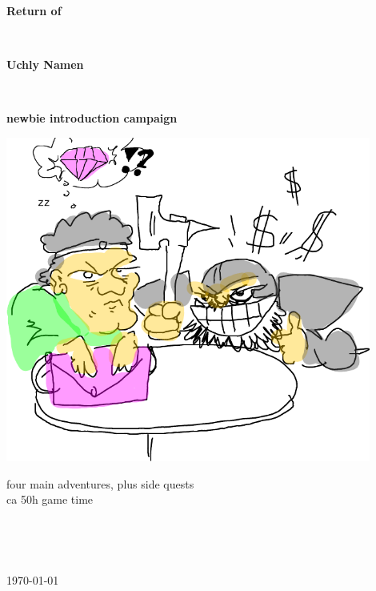 \begin{titlepage}

\begin{center}

   \vspace{4 cm}

   \textbf{\Huge{Return of}}

   \

   \textbf{\Huge{Uchly Namen}}

   \

   \textbf{\Large{newbie introduction campaign}}

   \vspace{2 cm}
   \includegraphics[width=120mm]{./figs/playthrough/negotiate.png}

   \vspace{2 cm}

   \normalsize
   four main adventures, plus side quests\\
   ca 50h game time


   \vfill %


   \



   \

   \normalsize{\today}

\end{center}


\end{titlepage}




